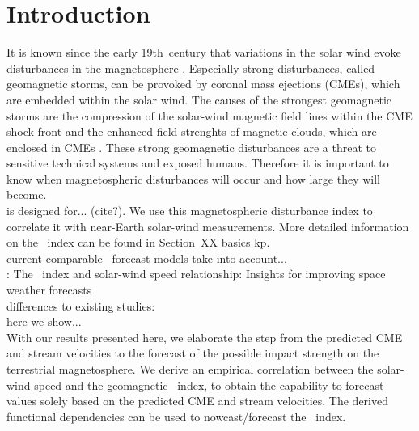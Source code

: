 
\section{Introduction}
It is known since the early 19th~century that variations in the solar wind evoke disturbances in the magnetosphere \citep{Bartels1962}. Especially strong disturbances, called geomagnetic storms, can be provoked by coronal mass ejections (CMEs), which are embedded within the solar wind. The causes of the strongest geomagnetic storms are the compression of the solar-wind magnetic field lines within the CME shock front and the enhanced field strenghts of magnetic clouds, which are enclosed in CMEs \citep{Bothmer1993}. These strong geomagnetic disturbances are a threat to sensitive technical systems and exposed humans. Therefore it is important to know when magnetospheric disturbances will occur and how large they will become.\\

\Kp{} is designed for... (cite?). We use this magnetospheric disturbance index to correlate it with near-Earth solar-wind measurements. More detailed information on the \Kp{}~index can be found in Section~XX basics kp.\\

current comparable \Kp~forecast models take into account...\\
\citet{Elliott2013}: The \Kp~index and solar-wind speed relationship: Insights for improving space weather forecasts\\
differences to existing studies:\\
here we show...\\

With our results presented here, we elaborate the step from the predicted CME and stream velocities to the forecast of the possible impact strength on the terrestrial magnetosphere. We derive an empirical correlation between the solar-wind speed and the geomagnetic \Kp~index, to obtain the capability to forecast \Kp{} values solely based on the predicted CME and stream velocities. The derived functional dependencies can be used to nowcast/forecast the \Kp~index.\\

